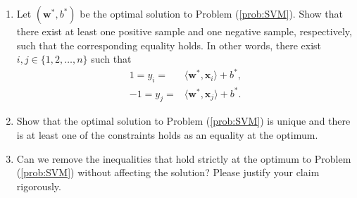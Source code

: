 \documentclass[11pt,letter,notitlepage]{article}
\begin{document}
\begin{exercise}
\begin{enumerate}
    (a) If the training set $\mathcal{D}$ is linearly separable, we have  $\mathbf{w}^*\neq0$;
    
    (b)If all samples in training set $\mathcal{D}$ are positive or negative, then $\mathbf{w}^*$ can be $0$.
    
    \item Let $(\textbf{w}^*,b^*)$ be the optimal solution to Problem (\ref{prob:SVM}). Show that there exist at least one positive sample and one negative sample, respectively, such that the corresponding equality holds. In other words, there exist $i,j \in \{ 1,2,\dots,n \}$ such that
    \begin{align*}
        1=y_i = &\langle \textbf{w}^*, \textbf{x}_i \rangle + b^*, \\
        -1=y_j = &\langle \textbf{w}^*, \textbf{x}_j \rangle + b^*.
    \end{align*}
    \item Show that the optimal solution to Problem (\ref{prob:SVM}) is unique and there is at least one of the constraints holds as an equality at the optimum.
    \item Can we remove the inequalities that hold strictly at the optimum to Problem (\ref{prob:SVM}) without affecting the solution? Please justify your claim rigorously.
    
\end{enumerate}

\end{exercise}
\begin{solution}
	
\end{solution}
\end{document}
